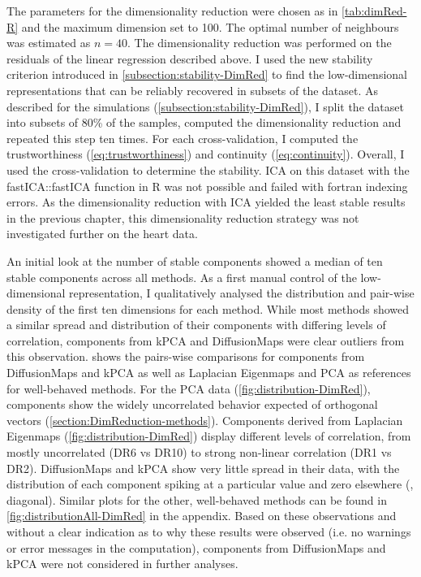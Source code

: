 The parameters for the dimensionality reduction were chosen as in \cref{tab:dimRed-R} and the maximum dimension set to \num{100}. The optimal number of neighbours was estimated as \(n=40\).  The dimensionality reduction was performed on the residuals of the linear regression described above. I used the new stability criterion introduced in \cref{subsection:stability-DimRed} to find the low-dimensional representations that can be reliably recovered in subsets of the dataset. 
As described for the simulations (\cref{subsection:stability-DimRed}), I split the dataset into subsets of \num{80}\% of the samples, computed the dimensionality reduction and repeated this step ten times. For each cross-validation, I computed the trustworthiness (\cref{eq:trustworthiness}) and continuity (\cref{eq:continuity}). Overall, I used the cross-validation to determine the stability. ICA on this dataset with the fastICA::fastICA function in R was not possible and failed with fortran indexing errors. As the dimensionality reduction with ICA yielded the least stable results in the previous chapter, this dimensionality reduction strategy was not investigated further on the heart data.  

An initial look at the number of stable components showed a median of ten stable components across all methods. As a first manual control of the low-dimensional representation, I qualitatively analysed the distribution and pair-wise density of the first ten dimensions for each method. While most methods showed a similar spread and distribution of their components with differing levels of correlation, components from kPCA and DiffusionMaps were clear outliers from this observation.  shows the pairs-wise comparisons for components from DiffusionMaps and kPCA as well as Laplacian Eigenmaps and PCA as references for well-behaved methods. For the PCA data (\cref{fig:distribution-DimRed}), components show the widely uncorrelated behavior expected of orthogonal vectors (\cref{section:DimReduction-methods}). Components derived from Laplacian Eigenmaps (\cref{fig:distribution-DimRed}) display different levels of correlation, from mostly uncorrelated (DR6 vs DR10) to strong non-linear correlation (DR1 vs DR2). DiffusionMaps and kPCA show very little spread in their data, with the distribution of each component spiking at a particular value and zero  elsewhere (, diagonal). Similar plots for the other, well-behaved methods can be found in \cref{fig:distributionAll-DimRed} in the appendix. Based on these observations and without a clear indication as to why these results were observed (i.e. no warnings or error messages in the computation), components from DiffusionMaps and kPCA were not considered in further analyses. 


